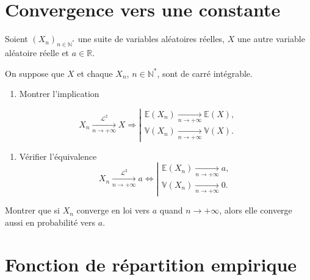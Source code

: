 \section{Convergence vers une
constante}\label{IV-convergence-vers-une-constante}

Soient \(\left(X_n\right)_{n\in\mathbb{N}^\ast}\) une suite de variables
aléatoires réelles, \(X\) une autre variable aléatoire réelle et
\(a \in \mathbb{R}\).

\label{IV-cvtocst-l2}
On suppose que \(X\) et chaque \(X_n\), \(n\in\mathbb{N}^\ast\), sont de
carré intégrable.

\begin{enumerate}
\def\labelenumi{\arabic{enumi}.}
\tightlist
\item
  Montrer l'implication
\end{enumerate}

\[X_n \xrightarrow[n\to+\infty]{\mathcal{L}^2} X \Rightarrow \left|\begin{array}{ll} \mathbb{E}\left(X_n\right) \xrightarrow[n\to+\infty]{} \mathbb{E}(X),\\ \mathbb{V}\left(X_n\right) \xrightarrow[n\to+\infty]{} \mathbb{V}(X). \end{array}\right.\]

\begin{enumerate}
\def\labelenumi{\arabic{enumi}.}
\setcounter{enumi}{1}
\tightlist
\item
  Vérifier l'équivalence
  \[X_n \xrightarrow[n\to+\infty]{\mathcal{L}^2} a \Leftrightarrow \left|\begin{array}{ll} \mathbb{E}\left(X_n\right) \xrightarrow[n\to+\infty]{} a,\\ \mathbb{V}\left(X_n\right) \xrightarrow[n\to+\infty]{} 0. \end{array}\right.\]
\end{enumerate}


\label{IV-cvtocst-loiprob}
Montrer que si \(X_n\) converge en loi vers \(a\) quand \(n\to+\infty\),
alors elle converge aussi en probabilité vers
\(a\).

\section{Fonction de répartition
empirique}\label{IV-fonction-de-ruxe9partition-empirique}

